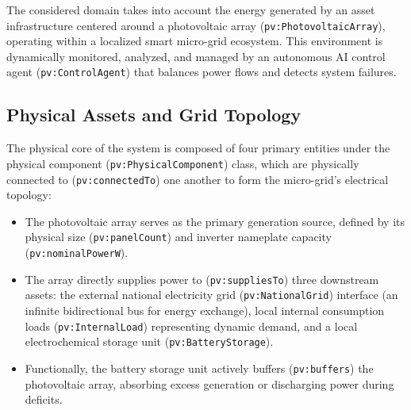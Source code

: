 The considered domain takes into account the energy generated by an asset infrastructure centered around a photovoltaic array (\texttt{pv:PhotovoltaicArray}), operating within a localized smart micro-grid ecosystem. This environment is dynamically monitored, analyzed, and managed by an autonomous AI control agent (\texttt{pv:ControlAgent}) that balances power flows and detects system failures.

\subsection{Physical Assets and Grid Topology}
The physical core of the system is composed of four primary entities under the physical component (\texttt{pv:PhysicalComponent}) class, which are physically connected to (\texttt{pv:connectedTo}) one another to form the micro-grid's electrical topology:
\begin{itemize}
    \item The photovoltaic array serves as the primary generation source, defined by its physical size (\texttt{pv:panelCount}) and inverter nameplate capacity (\texttt{pv:nominalPowerW}).
    \item The array directly supplies power to (\texttt{pv:suppliesTo}) three downstream assets: the external national electricity grid (\texttt{pv:NationalGrid}) interface (an infinite bidirectional bus for energy exchange), local internal consumption loads (\texttt{pv:InternalLoad}) representing dynamic demand, and a local electrochemical storage unit (\texttt{pv:BatteryStorage}).
    \item Functionally, the battery storage unit actively buffers (\texttt{pv:buffers}) the photovoltaic array, absorbing excess generation or discharging power during deficits.
\end{itemize}

